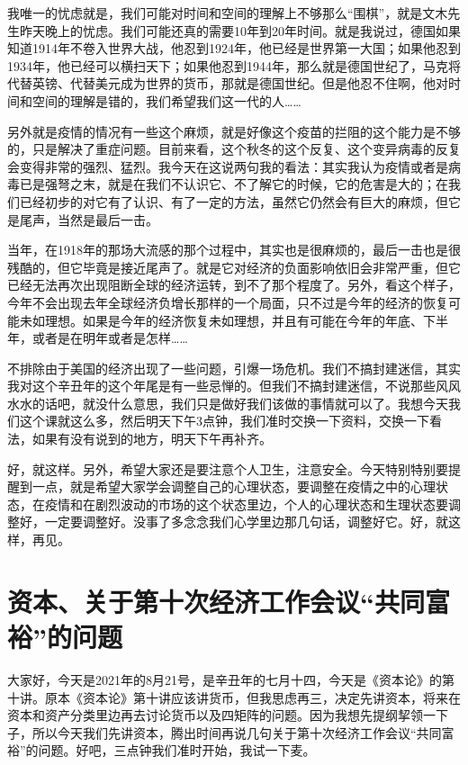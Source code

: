 \documentclass[UTF8, 12pt, a4paper]{ctexrep}
\begin{document}
我唯一的忧虑就是，我们可能对时间和空间的理解上不够那么“围棋”，就是文木先生昨天晚上的忧虑。我们可能还真的需要10年到20年时间。就是我说过，德国如果知道1914年不卷入世界大战，他忍到1924年，他已经是世界第一大国；如果他忍到1934年，他已经可以横扫天下；如果他忍到1944年，那么就是德国世纪了，马克将代替英镑、代替美元成为世界的货币，那就是德国世纪。但是他忍不住啊，他对时间和空间的理解是错的，我们希望我们这一代的人……

另外就是疫情的情况有一些这个麻烦，就是好像这个疫苗的拦阻的这个能力是不够的，只是解决了重症问题。目前来看，这个秋冬的这个反复、这个变异病毒的反复会变得非常的强烈、猛烈。我今天在这说两句我的看法：其实我认为疫情或者是病毒已是强弩之末，就是在我们不认识它、不了解它的时候，它的危害是大的；在我们已经初步的对它有了认识、有了一定的方法，虽然它仍然会有巨大的麻烦，但它是尾声，当然是最后一击。

当年，在1918年的那场大流感的那个过程中，其实也是很麻烦的，最后一击也是很残酷的，但它毕竟是接近尾声了。就是它对经济的负面影响依旧会非常严重，但它已经无法再次出现阻断全球的经济运转，到不了那个程度了。另外，看这个样子，今年不会出现去年全球经济负增长那样的一个局面，只不过是今年的经济的恢复可能未如理想。如果是今年的经济恢复未如理想，并且有可能在今年的年底、下半年，或者是在明年或者是怎样……

不排除由于美国的经济出现了一些问题，引爆一场危机。我们不搞封建迷信，其实我对这个辛丑年的这个年尾是有一些忌惮的。但我们不搞封建迷信，不说那些风风水水的话吧，就没什么意思，我们只是做好我们该做的事情就可以了。我想今天我们这个课就这么多，然后明天下午3点钟，我们准时交换一下资料，交换一下看法，如果有没有说到的地方，明天下午再补齐。

好，就这样。另外，希望大家还是要注意个人卫生，注意安全。今天特别特别要提醒到一点，就是希望大家学会调整自己的心理状态，要调整在疫情之中的心理状态，在疫情和在剧烈波动的市场的这个状态里边，个人的心理状态和生理状态要调整好，一定要调整好。没事了多念念我们心学里边那几句话，调整好它。好，就这样，再见。

\section{资本、关于第十次经济工作会议“共同富裕”的问题}

大家好，今天是2021年的8月21号，是辛丑年的七月十四，今天是《资本论》的第十讲。原本《资本论》第十讲应该讲货币，但我思虑再三，决定先讲资本，将来在资本和资产分类里边再去讨论货币以及四矩阵的问题。因为我想先提纲挈领一下子，所以今天我们先讲资本，腾出时间再说几句关于第十次经济工作会议“共同富裕”的问题。好吧，三点钟我们准时开始，我试一下麦。
\end{document}
